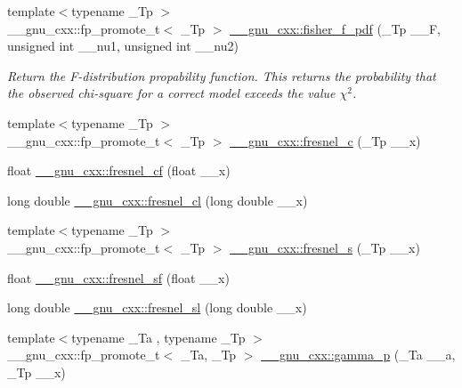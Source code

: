 \begin{DoxyCompactItemize}
{\footnotesize template$<$typename \+\_\+\+Tp $>$ }\\\+\_\+\+\_\+gnu\+\_\+cxx\+::fp\+\_\+promote\+\_\+t$<$ \+\_\+\+Tp $>$ \hyperlink{group__gnu__math__spec__func_gac4564fd8e265c000675e0f38d656a18a}{\+\_\+\+\_\+gnu\+\_\+cxx\+::fisher\+\_\+f\+\_\+pdf} (\+\_\+\+Tp \+\_\+\+\_\+F, unsigned int \+\_\+\+\_\+nu1, unsigned int \+\_\+\+\_\+nu2)
\begin{DoxyCompactList}\small\item\em Return the F-\/distribution propability function. This returns the probability that the observed chi-\/square for a correct model exceeds the value $ \chi^2 $. \end{DoxyCompactList}\item 
{\footnotesize template$<$typename \+\_\+\+Tp $>$ }\\\+\_\+\+\_\+gnu\+\_\+cxx\+::fp\+\_\+promote\+\_\+t$<$ \+\_\+\+Tp $>$ \hyperlink{group__gnu__math__spec__func_ga92a3585165bfad3f9972fb4210140d22}{\+\_\+\+\_\+gnu\+\_\+cxx\+::fresnel\+\_\+c} (\+\_\+\+Tp \+\_\+\+\_\+x)
\item 
float \hyperlink{group__gnu__math__spec__func_ga02ca7579d5aef96cba69e38e988e7a42}{\+\_\+\+\_\+gnu\+\_\+cxx\+::fresnel\+\_\+cf} (float \+\_\+\+\_\+x)
\item 
long double \hyperlink{group__gnu__math__spec__func_gaa3f82a7569d61c2f7c194d2e64b616f8}{\+\_\+\+\_\+gnu\+\_\+cxx\+::fresnel\+\_\+cl} (long double \+\_\+\+\_\+x)
\item 
{\footnotesize template$<$typename \+\_\+\+Tp $>$ }\\\+\_\+\+\_\+gnu\+\_\+cxx\+::fp\+\_\+promote\+\_\+t$<$ \+\_\+\+Tp $>$ \hyperlink{group__gnu__math__spec__func_ga075a32b4f59a5fa67c2e28232c89ad45}{\+\_\+\+\_\+gnu\+\_\+cxx\+::fresnel\+\_\+s} (\+\_\+\+Tp \+\_\+\+\_\+x)
\item 
float \hyperlink{group__gnu__math__spec__func_ga73450b8fd4abd5d8d3191dd6cbcda808}{\+\_\+\+\_\+gnu\+\_\+cxx\+::fresnel\+\_\+sf} (float \+\_\+\+\_\+x)
\item 
long double \hyperlink{group__gnu__math__spec__func_ga5d6ac976fa316df9b943f92bafe1407d}{\+\_\+\+\_\+gnu\+\_\+cxx\+::fresnel\+\_\+sl} (long double \+\_\+\+\_\+x)
\item 
{\footnotesize template$<$typename \+\_\+\+Ta , typename \+\_\+\+Tp $>$ }\\\+\_\+\+\_\+gnu\+\_\+cxx\+::fp\+\_\+promote\+\_\+t$<$ \+\_\+\+Ta, \+\_\+\+Tp $>$ \hyperlink{group__gnu__math__spec__func_ga692601fa7508c0b97bf549e6362a49b9}{\+\_\+\+\_\+gnu\+\_\+cxx\+::gamma\+\_\+p} (\+\_\+\+Ta \+\_\+\+\_\+a, \+\_\+\+Tp \+\_\+\+\_\+x)

\end{DoxyCompactItemize}
